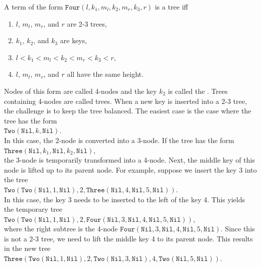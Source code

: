 A term of the form $\texttt{Four}(l,k_1,m_l, k_2, m_r, k_3, r)$ is a  tree iff
\begin{enumerate}
\item $l$, $m_l$, $m_r$, and $r$ are 2-3 trees,
\item $k_1$, $k_2$, and $k_3$ are keys,
\item $l < k_1 < m_l < k_2 < m_r < k_3 < r$,
\item $l$, $m_l$, $m_r$, and $r$ all have the same height.
\end{enumerate}
Nodes of this form are called 4-nodes and the key $k_2$ is called the .
Trees containing 4-nodes are called  trees.
When a new key is inserted into a 2-3 tree, the challenge is to keep the tree balanced.  The easiest
case is the case where the tree has the form
\\[0.2cm]
\hspace*{1.3cm}
$\texttt{Two}(\texttt{Nil}, k, \texttt{Nil})$.
\\[0.2cm]
In this case, the 2-node is converted into a 3-node.  If the tree has the form 
\\[0.2cm]
\hspace*{1.3cm}
$\texttt{Three}(\texttt{Nil}, k_1, \texttt{Nil}, k_2, \texttt{Nil})$,
\\[0.2cm]
the 3-node is temporarily transformed into a 4-node.  Next, the middle key of this node is lifted up
to its parent node.  For example, suppose we insert the key 3 into the tree
\\[0.2cm]
\hspace*{1.3cm}
$\texttt{Two}(\texttt{Two}(\texttt{Nil}, 1, \texttt{Nil}), 2, \texttt{Three}(\texttt{Nil}, 4, \texttt{Nil}, 5, \texttt{Nil}))$.
\\[0.2cm]
In this case, the key 3 needs to be inserted to the left of the key 4.  This yields the temporary tree 
\\[0.2cm]
\hspace*{1.3cm}
$\texttt{Two}(\texttt{Two}(\texttt{Nil}, 1, \texttt{Nil}), 2, \texttt{Four}(\texttt{Nil}, 3, \texttt{Nil}, 4, \texttt{Nil}, 5, \texttt{Nil}))$,
\\[0.2cm]
where the right subtree is the 4-node $\texttt{Four}(\texttt{Nil}, 3, \texttt{Nil}, 4, \texttt{Nil}, 5, \texttt{Nil})$.
Since this is not a 2-3 tree, we need to lift the middle key 4 to its parent node.  This results in
the new tree
\\[0.2cm]
\hspace*{1.3cm}
$\texttt{Three}(\texttt{Two}(\texttt{Nil}, 1, \texttt{Nil}), 2, \texttt{Two}(\texttt{Nil}, 3, \texttt{Nil}), 4, \texttt{Two}(\texttt{Nil}, 5, \texttt{Nil}))$.
